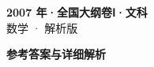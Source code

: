\documentclass[zihao=-4, a4paper]{ctexart}
\begin{document}
\begin{center}
  {\Large\bfseries 2007 年·全国大纲卷Ⅰ·文科}\\[4pt]
  {\large 数学 · 解析版}
\end{center}
\medskip
{}

\clearpage
{}
\begin{center}{\Large\bfseries 参考答案与详细解析}\end{center}
\medskip

\end{document}
